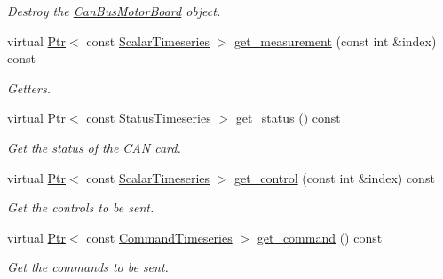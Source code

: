 \begin{DoxyCompactItemize}
\begin{DoxyCompactList}\small\item\em Destroy the \hyperlink{classblmc__drivers_1_1CanBusMotorBoard}{Can\+Bus\+Motor\+Board} object. \end{DoxyCompactList}\item 
virtual \hyperlink{classblmc__drivers_1_1MotorBoardInterface_a6a733b7ed7a3a96f6b0712b6bb5307f8}{Ptr}$<$ const \hyperlink{classblmc__drivers_1_1MotorBoardInterface_a14e237254ba495a66091ea3a3a33fa75}{Scalar\+Timeseries} $>$ \hyperlink{classblmc__drivers_1_1CanBusMotorBoard_a38094207eed00f6b1d75cfe9b5b87046}{get\+\_\+measurement} (const int \&index) const 
\begin{DoxyCompactList}\small\item\em Getters. \end{DoxyCompactList}\item 
virtual \hyperlink{classblmc__drivers_1_1MotorBoardInterface_a6a733b7ed7a3a96f6b0712b6bb5307f8}{Ptr}$<$ const \hyperlink{classblmc__drivers_1_1MotorBoardInterface_ae3777e484dda60c4abe87f2b542ddfb8}{Status\+Timeseries} $>$ \hyperlink{classblmc__drivers_1_1CanBusMotorBoard_a04aef38d8490ed8ac0e12cb09ef313e4}{get\+\_\+status} () const 
\begin{DoxyCompactList}\small\item\em Get the status of the C\+AN card. \end{DoxyCompactList}\item 
virtual \hyperlink{classblmc__drivers_1_1MotorBoardInterface_a6a733b7ed7a3a96f6b0712b6bb5307f8}{Ptr}$<$ const \hyperlink{classblmc__drivers_1_1MotorBoardInterface_a14e237254ba495a66091ea3a3a33fa75}{Scalar\+Timeseries} $>$ \hyperlink{classblmc__drivers_1_1CanBusMotorBoard_a298403ab64585ed459eda57165057fef}{get\+\_\+control} (const int \&index) const 
\begin{DoxyCompactList}\small\item\em Get the controls to be sent. \end{DoxyCompactList}\item 
virtual \hyperlink{classblmc__drivers_1_1MotorBoardInterface_a6a733b7ed7a3a96f6b0712b6bb5307f8}{Ptr}$<$ const \hyperlink{classblmc__drivers_1_1MotorBoardInterface_ae2afe94a023d9f08a4c689e9b7660f15}{Command\+Timeseries} $>$ \hyperlink{classblmc__drivers_1_1CanBusMotorBoard_abc8f5d6a631dc01a236d623754362e7d}{get\+\_\+command} () const 
\begin{DoxyCompactList}\small\item\em Get the commands to be sent. \end{DoxyCompactList}\item 

\end{DoxyCompactItemize}
